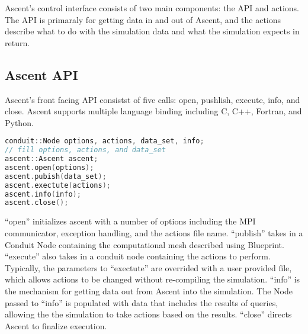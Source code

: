 Ascent's control interface consists of two main components:
the API and actions.
%
The API is primaraly for getting data in and out of Ascent,
and the actions describe what to do with the simulation data
and what the simulation expects in return.

\subsection{Ascent API}
Ascent's front facing API consistst of five calls:
open, pushlish, execute, info, and close.
%
Ascent supports multiple language binding including C, C++,
Fortran, and Python.


\begin{lstlisting}[language=C++,caption={This cool caption}]
conduit::Node options, actions, data_set, info;
// fill options, actions, and data_set
ascent::Ascent ascent;
ascent.open(options);
ascent.pubish(data_set);
ascent.exectute(actions);
ascent.info(info);
ascent.close();
\end{lstlisting}

``open'' initializes ascent with a number of options including the
MPI communicator, exception handling, and the actions file name.
%
``publish'' takes in a Conduit Node containing the computational
mesh described using Blueprint.
%
``execute'' also takes in a conduit node containing the actions to
perform.
%
Typically, the parameters to ``exectute'' are overrided with a user provided
file, which allows actions to be changed without re-compiling the simulation.
%
``info'' is the mechanism for getting data out from Ascent into the simulation.
%
The Node passed to ``info'' is populated with data that includes the results
of queries, allowing the the simulation to take actions based on the results.
%
``close'' directs Ascent to finalize execution.


